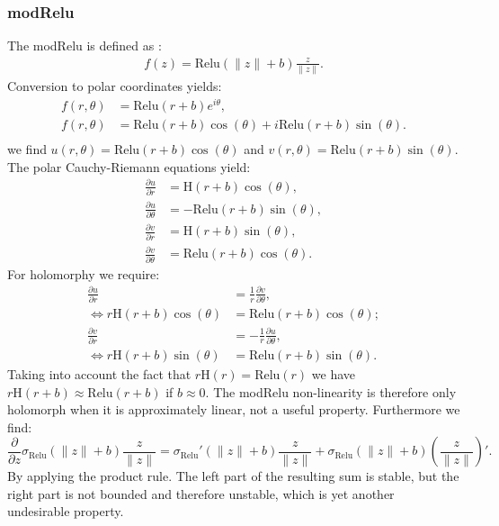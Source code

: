 \documentclass{article}
\begin{document}
\subsubsection{modRelu}
The modRelu is defined as \cite{Arjovsky}:
\begin{align}
f(z) = \text{Relu}(\|z\| + b) \frac{z}{\|z\|}.
\end{align}
Conversion to polar coordinates yields:
\begin{align}
f(r, \theta) &= \text{Relu}(r + b)e^{i\theta}, \\
f(r, \theta) &= \text{Relu}(r + b)\cos(\theta) + i\text{Relu}(r + b)\sin(\theta). \\
\end{align}
we find $u(r, \theta) = \text{Relu}(r + b)\cos(\theta)$ and $v(r, \theta) = \text{Relu}(r + b)\sin(\theta)$. The polar Cauchy-Riemann equations yield:
\begin{align}
\frac{\partial u}{\partial r} &= \text{H}(r + b)\cos(\theta),  \\
\frac{\partial u}{\partial \theta} &= -\text{Relu}(r + b)\sin(\theta), \\
\frac{\partial v}{\partial r} &= \text{H}(r + b)\sin(\theta), \\
\frac{\partial v}{\partial \theta} &= \text{Relu}(r + b)\cos(\theta).
\end{align}
For holomorphy we require:
\begin{align}
\frac{\partial u}{\partial r} &= \frac{1}{r} \frac{\partial v}{\partial \theta}, \\
\Leftrightarrow r\text{H}(r + b)\cos(\theta) &= \text{Relu}(r + b)\cos(\theta);\\
\frac{\partial v}{\partial r} &= - \frac{1}{r} \frac{\partial u}{\partial \theta}, \\ 
\Leftrightarrow r\text{H}(r + b)\sin(\theta) &= \text{Relu}(r + b)\sin(\theta).
\end{align}
Taking into account the fact that $r\text{H}(r) = \text{Relu}(r)$ we have $r\text{H}(r + b) \approx \text{Relu}(r + b)$ if $b \approx 0$. The modRelu non-linearity is therefore only holomorph when it is approximately linear, not a useful property. Furthermore we find:
\begin{equation}
\frac{\partial}{\partial z}\sigma_{\text{Relu}}(\|z\| + b) \frac{z}{\|z\|} = \sigma_{\text{Relu}}'(\|z\| + b) \frac{z}{\|z\|} + \sigma_{\text{Relu}}(\|z\| + b) (\frac{z}{\|z\|})'.
\end{equation}
By applying the product rule. The left part of the resulting sum is stable, but the right part is not bounded and therefore unstable, which is yet another undesirable property.
\end{document}

